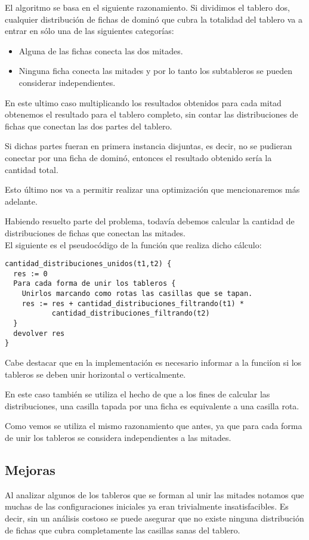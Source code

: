 \documentclass[a4paper, 12pt] {article}
\begin{document}
El algoritmo se basa en el siguiente razonamiento.
Si dividimos el tablero dos, cualquier distribuci\'on de fichas de domin\'o que cubra la totalidad del tablero va a entrar en s\'olo una de las siguientes categor\'ias:
\begin{itemize}
 \item Alguna de las fichas conecta las dos mitades.
 \item Ninguna ficha conecta las mitades y por lo tanto los subtableros se pueden considerar independientes.
\end{itemize} 

En este ultimo caso multiplicando los resultados obtenidos para cada mitad obtenemos el resultado para el tablero completo, sin contar las distribuciones de fichas que conectan las dos partes del tablero.  


Si dichas partes fueran en primera instancia disjuntas, es decir, no se pudieran conectar por una ficha de domin\'o, entonces el resultado obtenido ser\'ia la cantidad total. 


Esto \'ultimo nos va a permitir realizar una optimizaci\'on que mencionaremos m\'as adelante. 


Habiendo resuelto parte del problema, todav\'ia debemos calcular la cantidad de distribuciones de fichas que conectan las mitades. \\
El siguiente es el pseudoc\'odigo de la funci\'on que realiza dicho c\'alculo:

\begin{verbatim}
cantidad_distribuciones_unidos(t1,t2) {
  res := 0
  Para cada forma de unir los tableros {
    Unirlos marcando como rotas las casillas que se tapan.
    res := res + cantidad_distribuciones_filtrando(t1) * 
           cantidad_distribuciones_filtrando(t2)
  }
  devolver res
}
\end{verbatim}
Cabe destacar que en la implementaci\'on es necesario informar a la funci\'ion si los tableros se deben unir horizontal o verticalmente. 


En este caso tambi\'en se utiliza el hecho de que a los fines de calcular las distribuciones, una casilla tapada por una ficha es equivalente a una casilla rota.


Como vemos se utiliza el mismo razonamiento que antes, ya que para cada forma de unir los tableros se considera independientes a las mitades.


\subsection*{Mejoras}
Al analizar algunos de los tableros que se forman al unir las mitades notamos que muchas de las configuraciones iniciales ya eran trivialmente insatisfacibles. Es decir, sin un an\'alisis costoso se puede asegurar que no existe ninguna distribuci\'on de fichas que cubra completamente las casillas sanas del tablero. 
\end{document}
